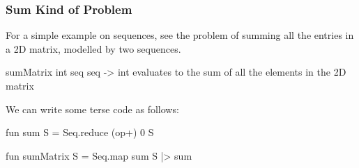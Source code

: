\documentclass[aspectratio=169, handout]{beamer}
\begin{document}

\begin{frame}[fragile]
  \frametitle{Sum Kind of Problem}

  For a simple example on sequences, see the problem of summing all
  the entries in a 2D matrix, modelled by two sequences.

  \pause
  \vspace{\fill}

  \spec
    {sumMatrix}
    {int seq seq -> int}
    {}
    { evaluates to the sum of all the elements in
    the 2D matrix }

  \pause
  \vspace{\fill}

  We can write some terse code as follows:

  \begin{codeblock}
    fun sum S = Seq.reduce (op+) 0 S

    fun sumMatrix S =
      Seq.map sum S
      |> sum
  \end{codeblock}
\end{frame}
\end{document}
